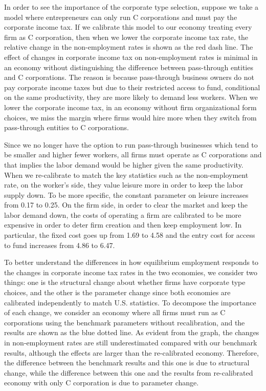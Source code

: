 \documentclass[12pt]{article}
\begin{document}
In order to see the importance of the corporate type selection, suppose we take a model where entrepreneurs can only run C corporations and must pay the corporate income tax. If we calibrate this model to our economy treating every firm as C corporation, then when we lower the corporate income tax rate, the relative change in the non-employment rates is shown as the red dash line. The effect of changes in corporate income tax on non-employment rates is minimal in an economy without distinguishing the difference between pass-through entities and C corporations. The reason is because pass-through business owners do not pay corporate income taxes but due to their restricted access to fund, conditional on the same productivity, they are more likely to demand less workers. When we lower the corporate income tax, in an economy without firm organizational form choices, we miss the margin where firms would hire more when they switch from pass-through entities to C corporations.


Since we no longer have the option to run pass-through businesses which tend to be smaller and higher fewer workers, all firms must operate as C corporations and that implies the labor demand would be higher given the same productivity. When we re-calibrate to match the key statistics such as the non-employment rate, on the worker's side, they value leisure more in order to keep the labor supply down. To be more specific, the constant parameter on leisure increases from 0.17 to 0.25. On the firm side, in order to clear the market and keep the labor demand down, the costs of operating a firm are calibrated to be more expensive in order to deter firm creation and then keep employment low. In particular, the fixed cost goes up from 1.69 to 4.58 and the entry cost for access to fund increases from 4.86 to 6.47.

To better understand the differences in how equilibrium employment responds to the changes in corporate income tax rates in the two economies, we consider two things: one is the structural change about whether firms have corporate type choices, and the other is the parameter change since both economies are calibrated independently to match U.S. statistics. To decompose the importance of each change, we consider an economy where all firms must run as C corporations using the benchmark parameters without recalibration, and the results are shown as the blue dotted line. As evident from the graph, the changes in non-employment rates are still underestimated compared with our benchmark results, although the effects are larger than the re-calibrated economy. Therefore, the difference between the benchmark results and this one is due to structural change, while the difference between this one and the results from re-calibrated economy with only C corporation is due to parameter change.
\end{document}
